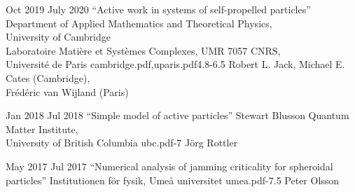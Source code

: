 \documentclass[a4paper]{cvtemplate_en} %
\begin{document}
\begin{cvbody}

\cvitem
	{Oct 2019}
	{July 2020}
  {``Active work in systems of self-propelled particles''}
  {Department of Applied Mathematics and Theoretical Physics,\\ University of Cambridge \\
	Laboratoire Mati\`ere et Syst\`emes Complexes, UMR 7057 CNRS,\\ Universit\'e de Paris }
  {cambridge.pdf,uparis.pdf}{4.8}{-6.5}
	{Robert L. Jack, Michael E. Cates (Cambridge),\\ Fr\'ed\'eric van Wijland (Paris)}
  {\\}

\cvitem
	{Jan 2018}
	{Jul 2018}
  {``Simple model of active particles''}
  {Stewart Blusson Quantum Matter Institute,\\ University of British Columbia }
  {ubc.pdf}{}{-7}
  {J\"org Rottler}
  {\\
  }

\cvitem
	{May 2017}
	{Jul 2017}
	{``Numerical analysis of jamming criticality for spheroidal particles''}
	{Institutionen f\"{o}r fysik, Ume\r{a} universitet }
	{umea.pdf}{}{-7.5}
	{Peter Olsson}
	{\\
	}


\end{cvbody}
\end{document}
